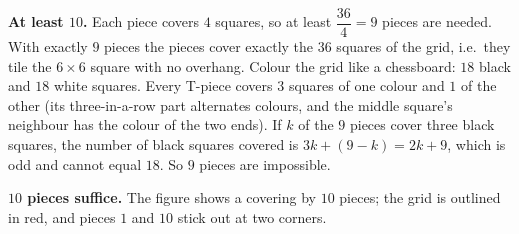 \textbf{At least $10$.} Each piece covers $4$ squares, so at least $\dfrac{36}{4}=9$ pieces are needed. With exactly $9$ pieces the pieces cover exactly the $36$ squares of the grid, i.e.\ they tile the $6\times6$ square with no overhang. Colour the grid like a chessboard: $18$ black and $18$ white squares. Every T-piece covers $3$ squares of one colour and $1$ of the other (its three-in-a-row part alternates colours, and the middle square's neighbour has the colour of the two ends). If $k$ of the $9$ pieces cover three black squares, the number of black squares covered is $3k+(9-k)=2k+9$, which is odd and cannot equal $18$. So $9$ pieces are impossible.

\textbf{$10$ pieces suffice.} The figure shows a covering by $10$ pieces; the grid is outlined in red, and pieces $1$ and $10$ stick out at two corners.

